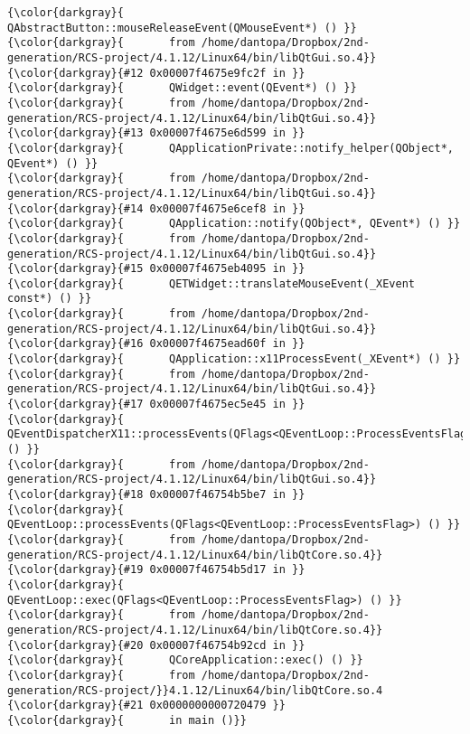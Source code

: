 {{\begin{Verbatim}[commandchars=\\\{\}]
{\color{darkgray}{       QAbstractButton::mouseReleaseEvent(QMouseEvent*) () }}
{\color{darkgray}{       from /home/dantopa/Dropbox/2nd-generation/RCS-project/4.1.12/Linux64/bin/libQtGui.so.4}}
{\color{darkgray}{#12 0x00007f4675e9fc2f in }}
{\color{darkgray}{       QWidget::event(QEvent*) () }}
{\color{darkgray}{       from /home/dantopa/Dropbox/2nd-generation/RCS-project/4.1.12/Linux64/bin/libQtGui.so.4}}
{\color{darkgray}{#13 0x00007f4675e6d599 in }}
{\color{darkgray}{       QApplicationPrivate::notify_helper(QObject*, QEvent*) () }}
{\color{darkgray}{       from /home/dantopa/Dropbox/2nd-generation/RCS-project/4.1.12/Linux64/bin/libQtGui.so.4}}
{\color{darkgray}{#14 0x00007f4675e6cef8 in }}
{\color{darkgray}{       QApplication::notify(QObject*, QEvent*) () }}
{\color{darkgray}{       from /home/dantopa/Dropbox/2nd-generation/RCS-project/4.1.12/Linux64/bin/libQtGui.so.4}}
{\color{darkgray}{#15 0x00007f4675eb4095 in }}
{\color{darkgray}{       QETWidget::translateMouseEvent(_XEvent const*) () }}
{\color{darkgray}{       from /home/dantopa/Dropbox/2nd-generation/RCS-project/4.1.12/Linux64/bin/libQtGui.so.4}}
{\color{darkgray}{#16 0x00007f4675ead60f in }}
{\color{darkgray}{       QApplication::x11ProcessEvent(_XEvent*) () }}
{\color{darkgray}{       from /home/dantopa/Dropbox/2nd-generation/RCS-project/4.1.12/Linux64/bin/libQtGui.so.4}}
{\color{darkgray}{#17 0x00007f4675ec5e45 in }}
{\color{darkgray}{       QEventDispatcherX11::processEvents(QFlags<QEventLoop::ProcessEventsFlag>) () }}
{\color{darkgray}{       from /home/dantopa/Dropbox/2nd-generation/RCS-project/4.1.12/Linux64/bin/libQtGui.so.4}}
{\color{darkgray}{#18 0x00007f46754b5be7 in }}
{\color{darkgray}{       QEventLoop::processEvents(QFlags<QEventLoop::ProcessEventsFlag>) () }}
{\color{darkgray}{       from /home/dantopa/Dropbox/2nd-generation/RCS-project/4.1.12/Linux64/bin/libQtCore.so.4}}
{\color{darkgray}{#19 0x00007f46754b5d17 in }}
{\color{darkgray}{       QEventLoop::exec(QFlags<QEventLoop::ProcessEventsFlag>) () }}
{\color{darkgray}{       from /home/dantopa/Dropbox/2nd-generation/RCS-project/4.1.12/Linux64/bin/libQtCore.so.4}}
{\color{darkgray}{#20 0x00007f46754b92cd in }}
{\color{darkgray}{       QCoreApplication::exec() () }}
{\color{darkgray}{       from /home/dantopa/Dropbox/2nd-generation/RCS-project/}}4.1.12/Linux64/bin/libQtCore.so.4
{\color{darkgray}{#21 0x0000000000720479 }}
{\color{darkgray}{       in main ()}}
\end{Verbatim}
}}

\endinput  %
